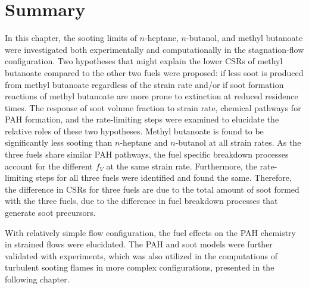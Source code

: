\section{Summary}

In this chapter, the sooting limits of $n$-heptane, $n$-butanol, and methyl butanoate were investigated both experimentally and computationally in the stagnation-flow configuration.  Two hypotheses that might explain the lower CSRs of methyl butanoate compared to the other two fuels were proposed: if less soot is produced from methyl butanoate regardless of the strain rate and/or if soot formation reactions of methyl butanoate are more prone to extinction at reduced residence times.  The response of soot volume fraction to strain rate, chemical pathways for PAH formation, and the rate-limiting steps were examined to elucidate the relative roles of these two hypotheses.  Methyl butanoate is found to be significantly less sooting than $n$-heptane and $n$-butanol at all strain rates.  As the three fuels share similar PAH pathways, the fuel specific breakdown processes account for the different $f_V$ at the same strain rate.  Furthermore, the rate-limiting steps for all three fuels were identified and found the same.  Therefore, the difference in CSRs for three fuels are due to the total amount of soot formed with the three fuels, due to the difference in fuel breakdown processes that generate soot precursors.

With relatively simple flow configuration, the fuel effects on the PAH chemistry in strained flows were elucidated.  The PAH and soot models were further validated with experiments, which was also utilized in the computations of turbulent sooting flames in more complex configurations, presented in the following chapter.

